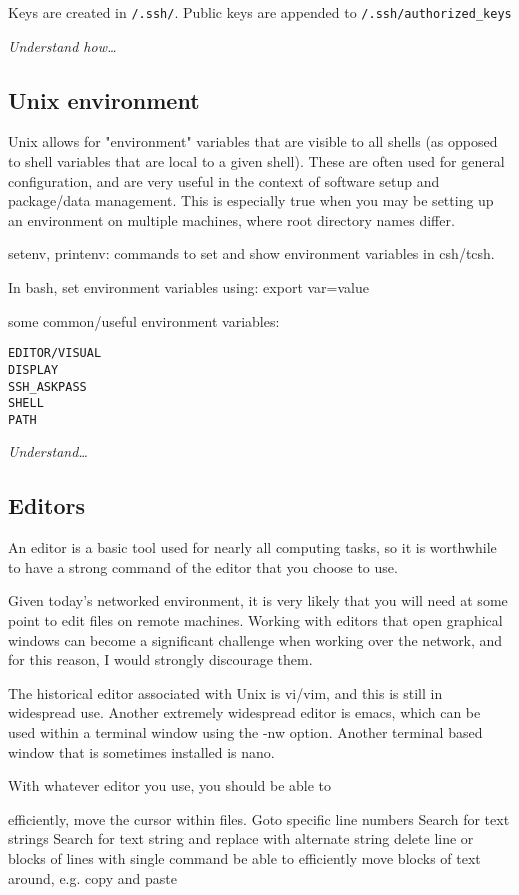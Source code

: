 \documentclass{article}
\newcommand{\test}[1]{%
    \begin{center}
        \colorbox{hl}{\parbox{0.9\textwidth}{\emph{\centering #1}}}
    \end{center}}
\begin{document}
Keys are created in \verb|/.ssh/|.
Public keys are appended to \verb|/.ssh/authorized_keys|

\test{Understand how\ldots}

\subsection{Unix environment}

Unix allows for "environment" variables that are visible to all shells
(as opposed to shell variables that are local to a given shell). These
are often used for general configuration, and are very useful in the
context of software setup and package/data management. This is
especially true when you may be setting up an environment on multiple
machines, where root directory names differ.

setenv, printenv: commands to set and show environment variables in
csh/tcsh.

In bash, set environment variables using: export var=value

some common/useful environment variables:
\begin{verbatim}
EDITOR/VISUAL
DISPLAY
SSH_ASKPASS
SHELL
PATH
\end{verbatim}

\test{Understand\ldots}

\subsection{Editors}
An editor is a basic tool used for nearly all computing tasks, so it
is worthwhile to have a strong command of the editor that you choose
to use.

Given today's networked environment, it is very likely that you will
need at some point to edit files on remote machines. Working with
editors that open graphical windows can become a significant challenge
when working over the network, and for this reason, I would strongly
discourage them.

The historical editor associated with Unix is vi/vim, and this is
still in widespread use. Another extremely widespread editor is emacs,
which can be used within a terminal window using the -nw option.
Another terminal based window that is sometimes installed is nano.

With whatever editor you use, you should be able to

efficiently, move the cursor within files. Goto specific line numbers
Search for text strings
Search for text string and replace with alternate string
delete line or blocks of lines with single command
be able to efficiently move blocks of text around, e.g. copy and paste
\end{document}
